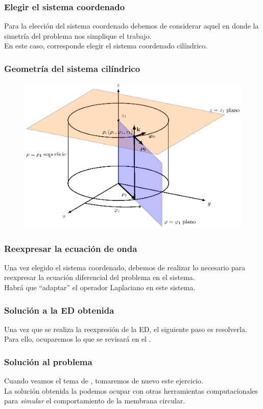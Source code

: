 \documentclass[12pt]{beamer}
\begin{document}
\begin{frame}
\frametitle{Elegir el sistema coordenado}
Para la elección del sistema coordenado debemos de considerar aquel en donde la simetría del problema nos simplique el trabajo.
\\
\bigskip
\pause
En este caso, corresponde elegir el sistema coordenado cilíndrico.
\end{frame}
\begin{frame}
\frametitle{Geometría del sistema cilíndrico}
\begin{figure}[H]
  \centering
  \includegraphics[scale=0.7]{Imagenes/Coordenadas_Cilindricas_01.eps}
\end{figure}
\end{frame}
\begin{frame}
\frametitle{Reexpresar la ecuación de onda}
Una vez elegido el sistema coordenado, debemos de realizar lo necesario para reexpresar la ecuación diferencial del problema en el sistema.
\\
\bigskip
\pause
Habrá que \enquote{adaptar} el operador Laplaciano en este sistema.
\end{frame}
\begin{frame}
\frametitle{Solución a la ED obtenida}
Una vez que se realiza la reexpresión de la ED, el siguiente paso es resolverla.
\\
\bigskip
\pause
Para ello, ocuparemos lo que se revisará en el \emph{}.
\end{frame}
\begin{frame}
\frametitle{Solución al problema}
Cuando veamos el tema de , tomaremos de nuevo este ejercicio.
\\
\bigskip
\pause
La solución obtenida la podemos ocupar con otras herramientas computacionales para \emph{simular} el comportamiento de la membrana circular.
\end{frame}
\end{document}
